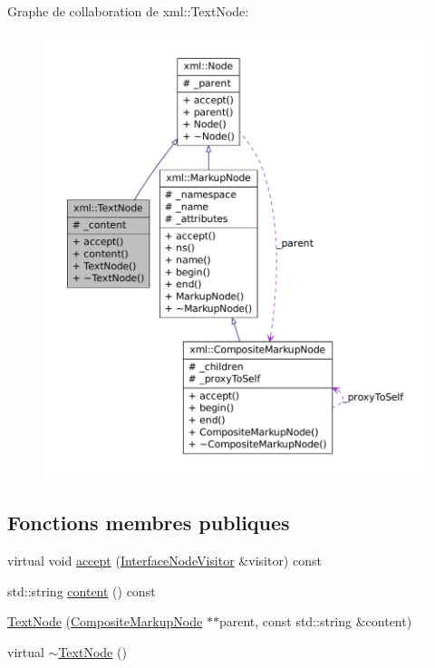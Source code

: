 Graphe de collaboration de xml::TextNode:
\nopagebreak
\begin{figure}[H]
\begin{center}
\leavevmode
\includegraphics[width=400pt]{classxml_1_1_text_node__coll__graph}
\end{center}
\end{figure}
\subsection*{Fonctions membres publiques}
\begin{DoxyCompactItemize}
\item 
virtual void \hyperlink{classxml_1_1_text_node_ac918f8f74e141690e18cd8e23d174996}{accept} (\hyperlink{classxml_1_1_interface_node_visitor}{InterfaceNodeVisitor} \&visitor) const 
\item 
std::string \hyperlink{classxml_1_1_text_node_a25941b48615a65258cc17d85bc0691d1}{content} () const 
\item 
\hyperlink{classxml_1_1_text_node_aa792bfa28288ba0b52f38215acb1feb0}{TextNode} (\hyperlink{classxml_1_1_composite_markup_node}{CompositeMarkupNode} $\ast$$\ast$parent, const std::string \&content)
\item 
virtual \hyperlink{classxml_1_1_text_node_a631efcd9de6889ba2b8f31e578267d29}{$\sim$TextNode} ()
\end{DoxyCompactItemize}
